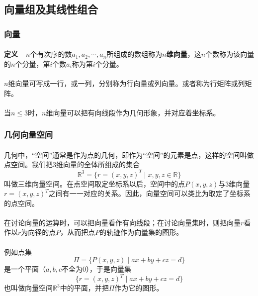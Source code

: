 \subsection{向量组及其线性组合}
\subsubsection{向量}
\paragraph{}
\textbf{定义~~}$n$个有次序的数$a_1, a_2, \cdots, a_n$所组成的数组称为\textbf{$n$维向量}，这$n$个数称为该向量的$n$个分量，第$i$个数$a_i$称为第$i$个分量。

\paragraph{}
$n$维向量可写成一行，或一列，分别称为行向量或列向量。或者称为行矩阵或列矩阵。

\paragraph{}
当$n \leq 3$时，$n$维向量可以把有向线段作为几何形象，并对应着坐标系。

\subsubsection{几何向量空间}
\paragraph{}
几何中，“空间”通常是作为点的几何，即作为“空间”的元素是点，这样的空间叫做点空间。我们把$3$维向量的全体所组成的集合
\begin{equation*}
\mathbb{R}^3 = \{r=(x,y,z)^T \;|\; x,y,z\in\mathbb{R}\}
\end{equation*}
叫做三维向量空间。在点空间取定坐标系以后，空间中的点$P(x,y,z)$与$3$维向量$r=(x,y,z)^T$之间有一一对应的关系。因此，向量空间可以类比为取定了坐标系的点空间。

\paragraph{}
在讨论向量的运算时，可以把向量看作有向线段；在讨论向量集时，则把向量$r$看作以$r$为向径的点$P$，从而把点$P$的轨迹作为向量集的图形。

\paragraph{}
例如点集
\begin{equation*}
 \Pi = \{P(x,y,z) \;|\; ax+by+cz=d\}
\end{equation*}
是一个平面（$a,b,c$不全为$0$），于是向量集
\begin{equation*}
  \{r=(x,y,z)^T \;|\; ax+by+cz=d\}
\end{equation*}
也叫做向量空间$\mathbb{R}^3$中的平面，并把$\Pi$作为它的图形。

